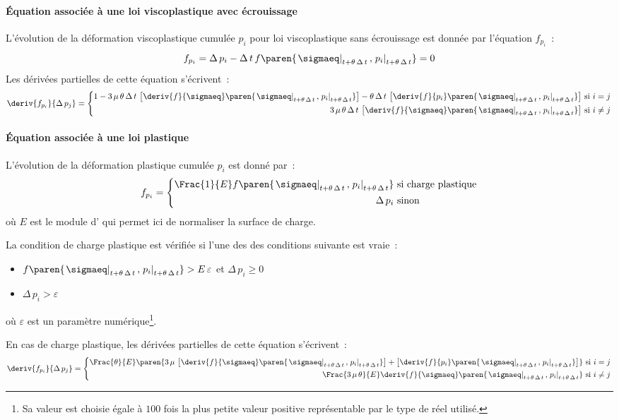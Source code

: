 \documentclass[rectoverso,pleiades,pstricks,leqno,anti]{texmf/note_technique_2010}
\newcommand{\milieupas}[1]{\ensuremath{\left.#1\right|_{t+\theta\, \Delta\, t}}}
\begin{document}
\paragraph{Équation associée à une loi viscoplastique avec écrouissage}
L'évolution de la déformation viscoplastique cumulée \(p_{i}\) pour loi
viscoplastique sans écrouissage est donnée par l'équation \(f_{p_{i}}\)~:
\[
f_{p_{i}} = \Delta\,p_{i}-\Delta\,t\,f\paren{\milieupas{\sigmaeq},\milieupas{p_{i}}}=0
\]
Les dérivées partielles de cette équation s'écrivent~:
\[
\deriv{f_{p_{i}}}{\Delta\, p_{j}}=
\left\{
\begin{aligned}
1-3\,\mu\,\theta\,\Delta\,t\,\left[\deriv{f}{\sigmaeq}\paren{\milieupas{\sigmaeq},\milieupas{p_{i}}}\right]-\theta\,\Delta\,t\,\left[\deriv{f}{p_{i}}\paren{\milieupas{\sigmaeq},\milieupas{p_{i}}}\right] & \text{ si } i=j \\
3\,\mu\,\theta\,\Delta\,t\,\left[\deriv{f}{\sigmaeq}\paren{\milieupas{\sigmaeq},\milieupas{p_{i}}}\right] & \text{ si } i\neq j
\end{aligned}
\right.
\]

\paragraph{Équation associée à une loi plastique} L'évolution de la
déformation plastique cumulée \(p_{i}\) est donné par~:
\[
f_{p_{i}} = \left\{
\begin{aligned}
  \Frac{1}{E}f\paren{\milieupas{\sigmaeq},\milieupas{p_{i}}} & \text{ si
    charge plastique} \\
  \Delta\,p_{i} & \text{ sinon}
\end{aligned}
\right.
\]
où \(E\) est le module d' qui permet ici de normaliser la
surface de charge.

La condition de charge plastique est vérifiée si l'une des des
conditions suivante est vraie~:
\begin{itemize}
\item \(f\paren{\milieupas{\sigmaeq},\milieupas{p_{i}}} >
  E\,\varepsilon\) et \(\Delta\,p_{i} \geq 0\)
\item \(\Delta\,p_{i} > \varepsilon\)
\end{itemize}
où \(\varepsilon\) est un paramètre numérique\footnote{Sa valeur est
  choisie égale à \(100\) fois la plus petite valeur positive
  représentable par le type de réel utilisé.}.

En cas de charge plastique, les dérivées partielles de cette équation
s'écrivent~:
\[
\deriv{f_{p_{i}}}{\Delta\, p_{j}}= \left\{
\begin{aligned}
  \Frac{\theta}{E}\paren{3\,\mu\,\left[\deriv{f}{\sigmaeq}\paren{\milieupas{\sigmaeq},\milieupas{p_{i}}}\right]+
    \left[\deriv{f}{p_{i}}\paren{\milieupas{\sigmaeq},\milieupas{p_{i}}}\right]} & \text{ si } i=j \\
  \Frac{3\,\mu\,\theta}{E}\deriv{f}{\sigmaeq}\paren{\milieupas{\sigmaeq},\milieupas{p_{i}}}
  & \text{ si } i\neq j
\end{aligned}
\right.
\]
\end{document}
